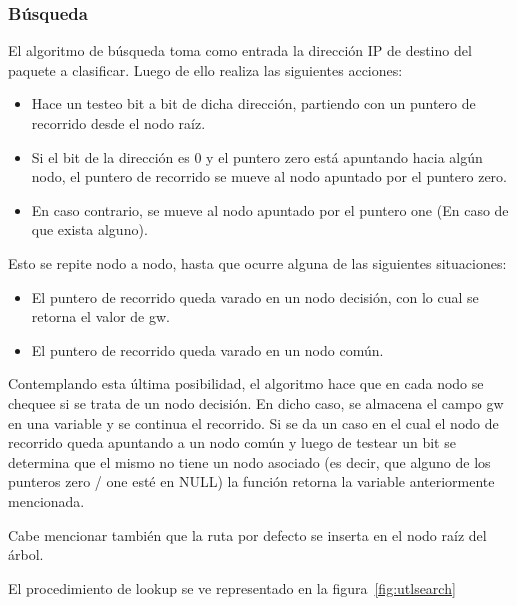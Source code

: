 \subsubsection{Búsqueda}

El algoritmo de búsqueda toma como entrada la dirección IP de destino del paquete a clasificar. Luego de ello realiza las siguientes acciones:
\begin{itemize}
	\item Hace un testeo bit a bit de dicha dirección, partiendo con un puntero de recorrido desde el nodo raíz.
	\item Si el bit de la dirección es 0 y el puntero zero está apuntando hacia algún nodo, el puntero de recorrido se mueve al nodo apuntado por el puntero zero.
	\item En caso contrario, se mueve al nodo apuntado por el puntero one (En caso de que exista alguno).
\end{itemize}

Esto se repite nodo a nodo, hasta que ocurre alguna de las siguientes situaciones:

\begin{itemize}
    	\item El puntero de recorrido queda varado en un nodo decisión, con lo cual se retorna el valor de gw.
    	\item El puntero de recorrido queda varado en un nodo común. 
\end{itemize}


Contemplando esta última posibilidad, el algoritmo hace que en cada nodo se chequee si se trata de un nodo decisión. En dicho caso, se almacena el campo gw en una variable y se continua el recorrido. Si se da un caso en el cual el nodo de recorrido queda apuntando a un nodo común y luego de testear un bit se determina que el mismo no tiene un nodo asociado (es decir, que alguno de los punteros zero / one esté en NULL) la función retorna la variable anteriormente mencionada. 

Cabe mencionar también que la ruta por defecto se inserta en el nodo raíz del árbol.

El procedimiento de lookup se ve representado en la figura~\ref{fig:utlsearch}

